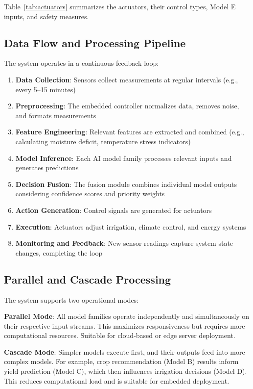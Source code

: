 \documentclass[conference]{IEEEtran}
\begin{document}
Table~\ref{tab:actuators} summarizes the actuators, their control types, Model E inputs, and safety measures.

\subsection{Data Flow and Processing Pipeline}

The system operates in a continuous feedback loop:

\begin{enumerate}
\item \textbf{Data Collection}: Sensors collect measurements at regular intervals (e.g., every 5--15 minutes)
\item \textbf{Preprocessing}: The embedded controller normalizes data, removes noise, and formats measurements
\item \textbf{Feature Engineering}: Relevant features are extracted and combined (e.g., calculating moisture deficit, temperature stress indicators)
\item \textbf{Model Inference}: Each AI model family processes relevant inputs and generates predictions
\item \textbf{Decision Fusion}: The fusion module combines individual model outputs considering confidence scores and priority weights
\item \textbf{Action Generation}: Control signals are generated for actuators
\item \textbf{Execution}: Actuators adjust irrigation, climate control, and energy systems
\item \textbf{Monitoring and Feedback}: New sensor readings capture system state changes, completing the loop
\end{enumerate}

\subsection{Parallel and Cascade Processing}

The system supports two operational modes:

\textbf{Parallel Mode}: All model families operate independently and simultaneously on their respective input streams. This maximizes responsiveness but requires more computational resources. Suitable for cloud-based or edge server deployment.

\textbf{Cascade Mode}: Simpler models execute first, and their outputs feed into more complex models. For example, crop recommendation (Model B) results inform yield prediction (Model C), which then influences irrigation decisions (Model D). This reduces computational load and is suitable for embedded deployment.
\end{document}
